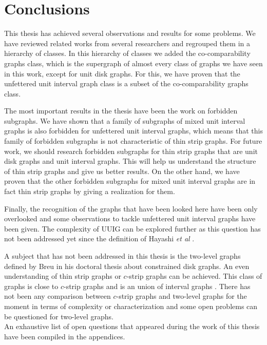 \chapter*{Conclusions}

This thesis has achieved several observations and results for some problems. We have reviewed related works from several researchers  and regrouped them in a hierarchy of classes. In this hierarchy of classes we added the co-comparability graphs class, which is the supergraph of almost every class of graphs we have seen in this work, except for unit disk graphs. For this, we have proven that the unfettered unit interval graph class is a subset of the co-comparability graphs class.

The most important results in the thesis have been the work on forbidden subgraphs. We have shown that a family of subgraphs of mixed unit interval graphs is also forbidden for unfettered unit interval graphs, which means that this family of forbidden subgraphs is not characteristic of thin strip graphs. For future work, we should research forbidden subgraphs for thin strip graphs that are unit disk graphs and unit interval graphs. This will help us understand the structure of thin strip graphs and give us better results. On the other hand, we have proven that the other forbidden subgraphs for mixed unit interval graphs are in fact thin strip graphs by giving a realization for them.

Finally, the recognition of the graphs that have been looked here have been only overlooked and some observations to tackle unfettered unit interval graphs have been given. The complexity of UUIG can be explored further as this question has not been addressed yet since the definition of Hayashi \textit{et al} \cite{hayashiThinStripGraphs2017}.

A subject that has not been addressed in this thesis is the two-level graphs defined by Breu in his doctoral thesis \cite{breuAlgorithmicAspectsConstrained1996} about constrained disk graphs. An even understanding of thin strip graphs or $c$-strip graphs can be achieved. This class of graphs is close to $c$-strip graphs and is an union of interval graphs \cite{breuAlgorithmicAspectsConstrained1996}. There has not been any comparison between $c$-strip graphs and two-level graphs for the moment in terms of complexity or characterization and some open problems can be questioned for two-level graphs.\\

An exhaustive list of open questions that appeared during the work of this thesis have been compiled in the appendices.
